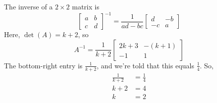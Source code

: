 \documentclass[11pt]{article}
\begin{document}
\begin{prob}[(12 pts)]
\begin{subprob}
\begin{solution}
The inverse of a $2 \times 2$ matrix is
\[
\begin{bmatrix}
a & b \\
c & d
\end{bmatrix}^{-1}
=
\frac{1}{ad-bc}
\begin{bmatrix}
d & -b \\
-c & a
\end{bmatrix}
\]
Here, $\det(A)=k+2$, so
\[
A^{-1}
=
\frac{1}{k+2}
\begin{bmatrix}
2k+3 & -(k+1) \\
-1 & 1
\end{bmatrix}
\]
The bottom-right entry is $\frac{1}{k+2}$, and we're told that this equals $\frac{1}{4}$. So,
\begin{align*}
\frac{1}{k+2} &= \frac{1}{4} \\
k+2 &= 4 \\
k &= 2
\end{align*}
\end{solution}
\end{subprob}

\end{prob}

\newpage
\end{document}
